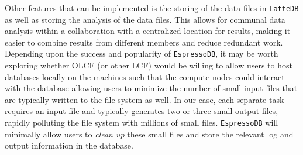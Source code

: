 Other features that can be implemented is the storing of the data files
in \texttt{LatteDB} as well as storing the analysis of the data files.
This allows for communal data analysis within a collaboration with a
centralized location for results, making it easier to combine results
from different members and reduce redundant work. Depending upon the
success and popularity of \texttt{EspressoDB}, it may be worth exploring
whether OLCF (or other LCF) would be willing to allow users to host
databases locally on the machines such that the compute nodes could
interact with the database allowing users to minimize the number of
small input files that are typically written to the file system as well.
In our case, each separate task requires an input file and typically
generates two or three small output files, rapidly polluting the file
system with millions of small files. \texttt{EspressoDB} will minimally
allow users to \emph{clean up} these small files and store the relevant
log and output information in the database.
